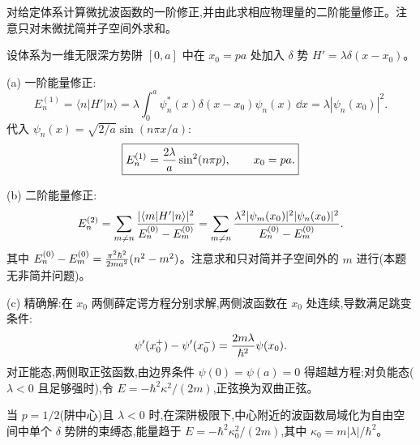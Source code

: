 \begin{question}
对给定体系计算微扰波函数的一阶修正,并由此求相应物理量的二阶能量修正。注意只对未微扰简并子空间外求和。
\begin{solution}
设体系为一维无限深方势阱 $[0,a]$ 中在 $x_0=pa$ 处加入 $\delta$ 势 $H'=\lambda\delta(x-x_0)$。

(a) 一阶能量修正:
\[
E_n^{(1)} = \langle n|H'|n\rangle = \lambda\int_0^a \psi_n^*(x)\delta(x-x_0)\psi_n(x)\,\dd x = \lambda|\psi_n(x_0)|^2.
\]
代入 $\psi_n(x)=\sqrt{2/a}\sin(n\pi x/a)$:
\[
\boxed{E_n^{(1)} = {2\lambda\over a}\sin^2(n\pi p),\qquad x_0=pa.}
\]

(b) 二阶能量修正:
\[
E_n^{(2)} = \sum_{m\ne n} {|\langle m|H'|n\rangle|^2\over E_n^{(0)}-E_m^{(0)}}
= \sum_{m\ne n} {\lambda^2 |\psi_m(x_0)|^2|\psi_n(x_0)|^2\over E_n^{(0)}-E_m^{(0)}}.
\]
其中 $E_n^{(0)}-E_m^{(0)} = {\pi^2\hbar^2\over2ma^2}(n^2-m^2)$。注意求和只对简并子空间外的 $m$ 进行(本题无非简并问题)。

(c) 精确解:在 $x_0$ 两侧薛定谔方程分别求解,两侧波函数在 $x_0$ 处连续,导数满足跳变条件:
\[
\psi'(x_0^+)-\psi'(x_0^-) = {2m\lambda\over\hbar^2}\psi(x_0).
\]
对正能态,两侧取正弦函数,由边界条件 $\psi(0)=\psi(a)=0$ 得超越方程;对负能态($\lambda<0$ 且足够强时),令 $E=-\hbar^2\kappa^2/(2m)$,正弦换为双曲正弦。

当 $p=1/2$(阱中心)且 $\lambda<0$ 时,在深阱极限下,中心附近的波函数局域化为自由空间中单个 $\delta$ 势阱的束缚态,能量趋于 $E=-\hbar^2\kappa_0^2/(2m)$,其中 $\kappa_0 = m|\lambda|/\hbar^2$。
\end{solution}
\end{question}

